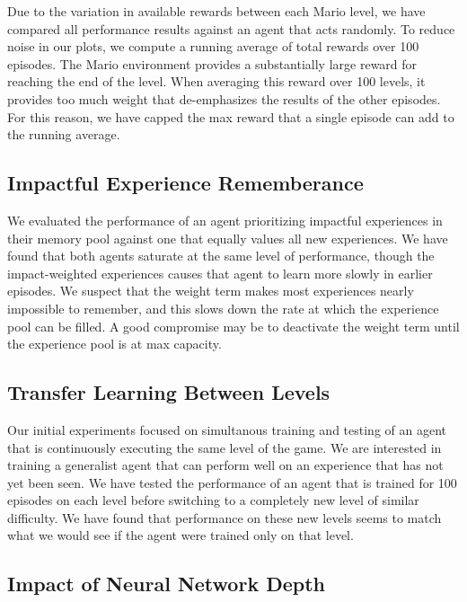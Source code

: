\documentclass{article}
\begin{document}
Due to the variation in available rewards between each Mario level, we have compared all performance results against an agent that acts randomly. To reduce noise in our plots, we compute a running average of total rewards over 100 episodes. The Mario environment provides a substantially large reward for reaching the end of the level. When averaging this reward over 100 levels, it provides too much weight that de-emphasizes the results of the other episodes. For this reason, we have capped the max reward that a single episode can add to the running average.
 
 \subsection{Impactful Experience Rememberance}
 We evaluated the performance of an agent prioritizing impactful experiences in their memory pool against one that equally values all new experiences. We have found that both agents saturate at the same level of performance, though the impact-weighted experiences causes that agent to learn more slowly in earlier episodes. We suspect that the weight term makes most experiences nearly impossible to remember, and this slows down the rate at which the experience pool can be filled. A good compromise may be to deactivate the weight term until the experience pool is at max capacity.
 
 \subsection{Transfer Learning Between Levels}
 
 Our initial experiments focused on simultanous training and testing of an agent that is continuously executing the same level of the game. We are interested in training a generalist agent that can perform well on an experience that has not yet been seen. We have tested the performance of an agent that is trained for 100 episodes on each level before switching to a completely new level of similar difficulty. We have found that performance on these new levels seems to match what we would see if the agent were trained only on that level.
 
 \subsection{Impact of Neural Network Depth}
 
\end{document}

